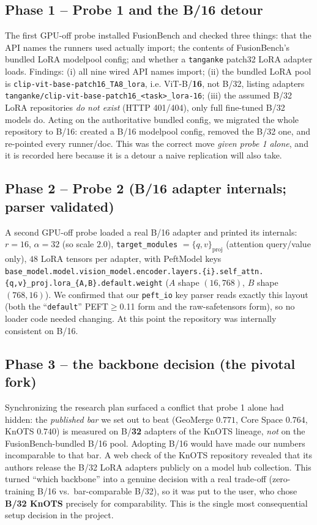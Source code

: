 \subsection{Phase 1 -- Probe 1 and the B/16 detour}
\label{app:phase-probe1}
The first GPU-off probe installed FusionBench and checked three things: that the API names the runners
used actually import; the contents of FusionBench's bundled LoRA modelpool config; and whether a
\texttt{tanganke} patch32 LoRA adapter loads. Findings: (i) all nine wired API names import; (ii) the
bundled LoRA pool is \texttt{clip-vit-base-patch16\_TA8\_lora}, i.e. ViT-B/\textbf{16}, not B/32, listing
adapters \texttt{tanganke/clip-vit-base-patch16\_<task>\_lora-16}; (iii) the assumed B/32 LoRA
repositories \emph{do not exist} (HTTP 401/404), only full fine-tuned B/32 models do. Acting on the
authoritative bundled config, we migrated the whole repository to B/16: created a B/16 modelpool config,
removed the B/32 one, and re-pointed every runner/doc. This was the correct move \emph{given probe 1
alone}, and it is recorded here because it is a detour a naive replication will also take.

\subsection{Phase 2 -- Probe 2 (B/16 adapter internals; parser validated)}
A second GPU-off probe loaded a real B/16 adapter and printed its internals: $r=16$, $\alpha=32$ (so
scale $2.0$), \texttt{target\_modules} $=\{q,v\}_{\text{proj}}$ (attention query/value only), $48$ LoRA
tensors per adapter, with PeftModel keys
\texttt{base\_model.model.vision\_model.encoder.layers.\{i\}.self\_attn.\{q,v\}\_proj.lora\_\{A,B\}.default.weight}
($A$ shape $(16,768)$, $B$ shape $(768,16)$). We confirmed that our \texttt{peft\_io} key parser reads
exactly this layout (both the ``\texttt{default}'' PEFT$\ge$0.11 form and the raw-safetensors form), so no
loader code needed changing. At this point the repository was internally consistent on B/16.

\subsection{Phase 3 -- the backbone decision (the pivotal fork)}
\label{app:phase-backbone}
Synchronizing the research plan surfaced a conflict that probe 1 alone had hidden: the \emph{published
bar} we set out to beat (GeoMerge $0.771$, Core Space $0.764$, KnOTS $0.740$) is measured on B/\textbf{32}
adapters of the KnOTS lineage, \emph{not} on the FusionBench-bundled B/16 pool. Adopting B/16 would have
made our numbers incomparable to that bar. A web check of the KnOTS repository revealed that its authors
release the B/32 LoRA adapters publicly on a model hub collection. This turned ``which backbone'' into a
genuine decision with a real trade-off (zero-training B/16 vs.\ bar-comparable B/32), so it was put to the
user, who chose \textbf{B/32 KnOTS} precisely for comparability. This is the single most consequential
setup decision in the project.

